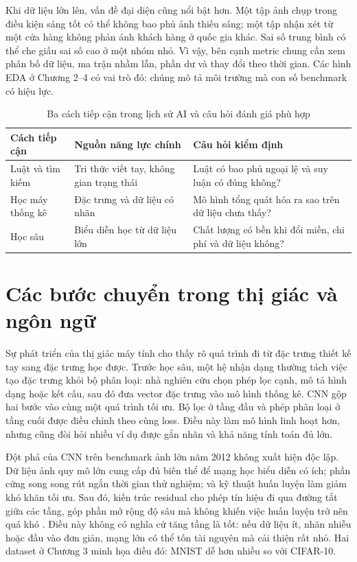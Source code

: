 \documentclass[12pt,a4paper]{report}
\begin{document}
Khi dữ liệu lớn lên, vấn đề đại diện cũng nổi bật hơn. Một tập ảnh chụp trong điều kiện sáng tốt có thể không bao phủ ảnh thiếu sáng; một tập nhận xét từ một cửa hàng không phản ánh khách hàng ở quốc gia khác. Sai số trung bình có thể che giấu sai số cao ở một nhóm nhỏ. Vì vậy, bên cạnh metric chung cần xem phân bố dữ liệu, ma trận nhầm lẫn, phần dư và thay đổi theo thời gian. Các hình EDA ở Chương 2--4 có vai trò đó: chúng mô tả môi trường mà con số benchmark có hiệu lực.

\begin{table}[htbp]\centering\caption{Ba cách tiếp cận trong lịch sử AI và câu hỏi đánh giá phù hợp}\label{tab:history-paradigms}
\begin{tabularx}{\textwidth}{p{2.4cm}p{3.3cm}X}
\toprule\textbf{Cách tiếp cận} & \textbf{Nguồn năng lực chính} & \textbf{Câu hỏi kiểm định} \\\midrule
Luật và tìm kiếm & Tri thức viết tay, không gian trạng thái & Luật có bao phủ ngoại lệ và suy luận có đúng không?\\
Học máy thống kê & Đặc trưng và dữ liệu có nhãn & Mô hình tổng quát hóa ra sao trên dữ liệu chưa thấy?\\
Học sâu & Biểu diễn học từ dữ liệu lớn & Chất lượng có bền khi đổi miền, chi phí và dữ liệu không?\\
\bottomrule\end{tabularx}\end{table}

\section{Các bước chuyển trong thị giác và ngôn ngữ}
Sự phát triển của thị giác máy tính cho thấy rõ quá trình đi từ đặc trưng thiết kế tay sang đặc trưng học được. Trước học sâu, một hệ nhận dạng thường tách việc tạo đặc trưng khỏi bộ phân loại: nhà nghiên cứu chọn phép lọc cạnh, mô tả hình dạng hoặc kết cấu, sau đó đưa vector đặc trưng vào mô hình thống kê. CNN gộp hai bước vào cùng một quá trình tối ưu. Bộ lọc ở tầng đầu và phép phân loại ở tầng cuối được điều chỉnh theo cùng loss. Điều này làm mô hình linh hoạt hơn, nhưng cũng đòi hỏi nhiều ví dụ được gắn nhãn và khả năng tính toán đủ lớn.

Đột phá của CNN trên benchmark ảnh lớn năm 2012 không xuất hiện độc lập. Dữ liệu ảnh quy mô lớn cung cấp đủ biến thể để mạng học biểu diễn có ích; phần cứng song song rút ngắn thời gian thử nghiệm; và kỹ thuật huấn luyện làm giảm khó khăn tối ưu. Sau đó, kiến trúc residual cho phép tín hiệu đi qua đường tắt giữa các tầng, góp phần mở rộng độ sâu mà không khiến việc huấn luyện trở nên quá khó \cite{resnet2016}. Điều này không có nghĩa cứ tăng tầng là tốt: nếu dữ liệu ít, nhãn nhiễu hoặc đầu vào đơn giản, mạng lớn có thể tốn tài nguyên mà cải thiện rất nhỏ. Hai dataset ở Chương 3 minh họa điều đó: MNIST dễ hơn nhiều so với CIFAR-10.
\end{document}
